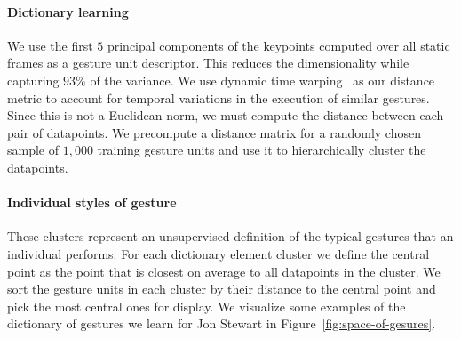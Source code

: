 \documentclass[10pt,twocolumn,letterpaper]{article}
\newcommand{\mypar}[1]{\vspace{-2mm}\paragraph{#1}}
\begin{document}
\mypar{Dictionary learning} We use the first $5$ principal components of the keypoints computed over all static frames as a gesture unit descriptor. This reduces the dimensionality while capturing $93\%$ of the variance. We use dynamic time warping~\cite{dtw} as our distance metric to account for temporal variations in the execution of similar gestures. Since this is not a Euclidean norm, we must compute the distance between each pair of datapoints. We precompute a distance matrix for a randomly chosen sample of $1,000$ training gesture units and use it to hierarchically cluster the datapoints. 

\mypar{Individual styles of gesture} These clusters represent an unsupervised definition of the typical gestures that an individual performs. For each dictionary element cluster we define the central point as the point that is closest on average to all datapoints in the cluster. We sort the gesture units in each cluster by their distance to the central point and pick the most central ones for display. We visualize some examples of the dictionary of gestures we learn for Jon Stewart in Figure~\ref{fig:space-of-gesures}. 
\end{document}

